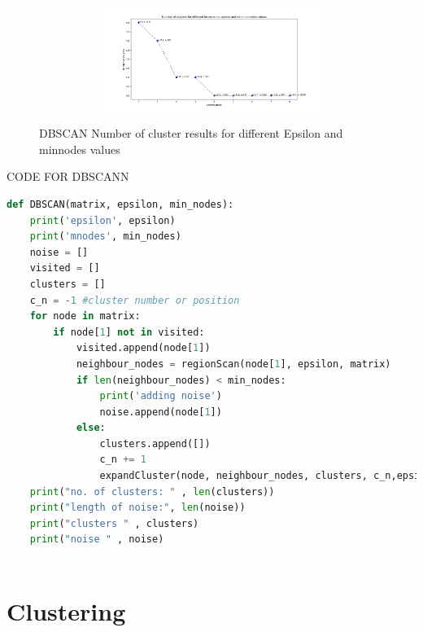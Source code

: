 \documentclass{article}
\begin{document}
\begin{figure}[H]
\begin{subfigure}{1\textwidth}
\begin{subfigure}{.5\textwidth}
            \caption{}
        \end{subfigure}
        \begin{subfigure}{.5\textwidth} 
            \centering  
            \includegraphics[width=1\linewidth]{./img/inc.png}
            \caption{}
        \end{subfigure}                
    \end{subfigure}
    \caption{DBSCAN Number of cluster results for different Epsilon and minnodes values}
    \label{fig:dbresults}
\end{figure}

CODE FOR DBSCANN
\begin{lstlisting}[language=Python, caption= DBSCAN Algorithm, label={lst:DBSCAN implementation}]
def DBSCAN(matrix, epsilon, min_nodes):
    print('epsilon', epsilon)
    print('mnodes', min_nodes)
    noise = []
    visited = []
    clusters = []
    c_n = -1 #cluster number or position
    for node in matrix:
        if node[1] not in visited:
            visited.append(node[1])
            neighbour_nodes = regionScan(node[1], epsilon, matrix)
            if len(neighbour_nodes) < min_nodes:
                print('adding noise')
                noise.append(node[1])
            else:
                clusters.append([])
                c_n += 1
                expandCluster(node, neighbour_nodes, clusters, c_n,epsilon, min_nodes, matrix, visited)
    print("no. of clusters: " , len(clusters))
    print("length of noise:", len(noise))
    print("clusters " , clusters)
    print("noise " , noise)
            
            \end{lstlisting}

        \section{Clustering}
        
\end{document}
